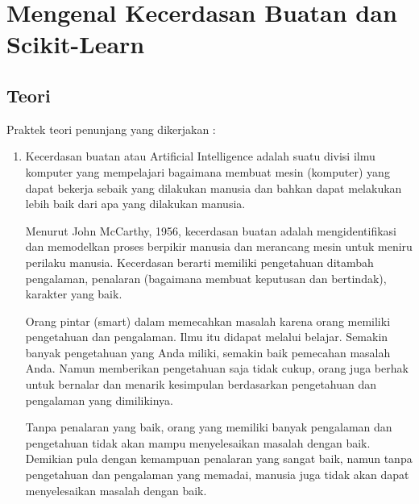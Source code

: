 \chapter{Mengenal Kecerdasan Buatan dan Scikit-Learn}

\section{Teori}
Praktek teori penunjang yang dikerjakan :
\begin{enumerate}
	\item Kecerdasan buatan atau Artificial Intelligence adalah suatu divisi ilmu komputer yang 
	mempelajari bagaimana membuat mesin (komputer) yang dapat bekerja sebaik yang dilakukan  manusia 
	dan bahkan dapat melakukan lebih baik dari apa yang dilakukan manusia.\\
	\par
	Menurut John McCarthy, 1956, kecerdasan buatan adalah mengidentifikasi dan memodelkan proses berpikir
	manusia dan merancang mesin untuk meniru perilaku manusia. Kecerdasan berarti memiliki pengetahuan 
	ditambah pengalaman, penalaran (bagaimana membuat keputusan dan bertindak), karakter yang baik.\\
	\par
	Orang pintar (smart) dalam memecahkan masalah karena orang memiliki pengetahuan dan pengalaman. Ilmu 
	itu didapat melalui belajar. Semakin banyak  pengetahuan yang Anda miliki, semakin baik pemecahan 
	masalah Anda. Namun memberikan pengetahuan saja tidak cukup, orang juga berhak untuk bernalar dan 
	menarik kesimpulan berdasarkan pengetahuan dan pengalaman yang dimilikinya.\\
	\par
	Tanpa penalaran yang baik, orang yang memiliki banyak pengalaman dan pengetahuan tidak akan mampu 
	menyelesaikan masalah dengan baik. Demikian pula dengan kemampuan penalaran yang sangat baik, namun 
	tanpa  pengetahuan dan pengalaman yang memadai, manusia juga tidak akan dapat menyelesaikan masalah 
	dengan baik.\\


\end{enumerate}
